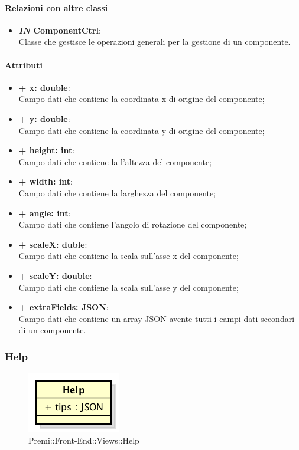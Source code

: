 	\paragraph{Relazioni con altre classi}
	\begin{itemize}
		\item \textbf{\textit{IN} ComponentCtrl}:\\
		Classe che gestisce le operazioni generali per la gestione di un componente.
	\end{itemize}
	
	\paragraph{Attributi}
	\begin{itemize}
		\item \textbf{+ x: double}:\\
			Campo dati che contiene la coordinata x di origine del componente;
		\item \textbf{+ y: double}:\\
			Campo dati che contiene la coordinata y di origine del componente;
		\item \textbf{+ height: int}:\\
			Campo dati che contiene la l'altezza del componente;
		\item \textbf{+ width: int}:\\
			Campo dati che contiene la larghezza del componente;
		\item \textbf{+ angle: int}:\\
			Campo dati che contiene l'angolo di rotazione del componente;
		\item \textbf{+ scaleX: duble}:\\
			Campo dati che contiene la scala sull'asse x del componente;
		\item \textbf{+ scaleY: double}:\\
			Campo dati che contiene la scala sull'asse y del componente;
		\item \textbf{+ extraFields: JSON}:\\
			Campo dati che contiene un array JSON avente tutti i campi dati secondari di un componente.
	\end{itemize}
\newpage
	

\subsubsection{Help}
	\begin{figure}[h]
		\centering
		\includegraphics[width=0.3\linewidth]{img/premi_front_end_views_help}
		\caption[Premi::Front-End::Views::Help]{Premi::Front-End::Views::Help}
	\end{figure}
	

